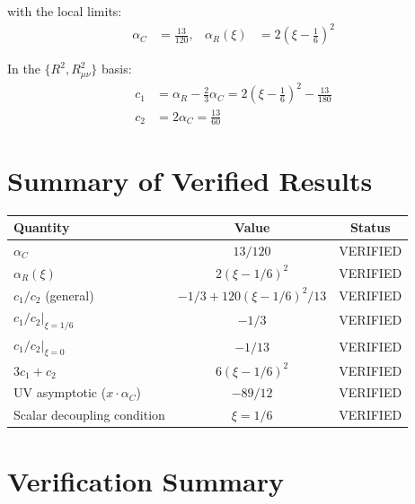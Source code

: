 \documentclass[11pt,a4paper]{article}
\begin{document}
with the local limits:
\begin{align}
  \alpha_C &= \frac{13}{120}, &
  \alpha_R(\xi) &= 2\!\left(\xi - \frac{1}{6}\right)^{\!2}
\end{align}

In the $\{R^2, R_{\mu\nu}^2\}$ basis:
\begin{align}
  c_1 &= \alpha_R - \frac{2}{3}\alpha_C = 2\!\left(\xi - \frac{1}{6}\right)^{\!2} - \frac{13}{180} \\
  c_2 &= 2\alpha_C = \frac{13}{60}
\end{align}

\section{Summary of Verified Results}

\begin{center}
\renewcommand{\arraystretch}{1.4}
\begin{tabular}{lcc}
  \toprule
  \textbf{Quantity} & \textbf{Value} & \textbf{Status} \\
  \midrule
  $\alpha_C$ & $13/120$ & \textcolor{verified}{VERIFIED} \\
  $\alpha_R(\xi)$ & $2(\xi - 1/6)^2$ & \textcolor{verified}{VERIFIED} \\
  $c_1/c_2$ (general) & $-1/3 + 120(\xi-1/6)^2/13$ & \textcolor{verified}{VERIFIED} \\
  $c_1/c_2|_{\xi=1/6}$ & $-1/3$ & \textcolor{verified}{VERIFIED} \\
  $c_1/c_2|_{\xi=0}$ & $-1/13$ & \textcolor{verified}{VERIFIED} \\
  $3c_1 + c_2$ & $6(\xi - 1/6)^2$ & \textcolor{verified}{VERIFIED} \\
  UV asymptotic ($x \cdot \alpha_C$) & $-89/12$ & \textcolor{verified}{VERIFIED} \\
  Scalar decoupling condition & $\xi = 1/6$ & \textcolor{verified}{VERIFIED} \\
  \bottomrule
\end{tabular}
\end{center}

\section{Verification Summary}
\end{document}
